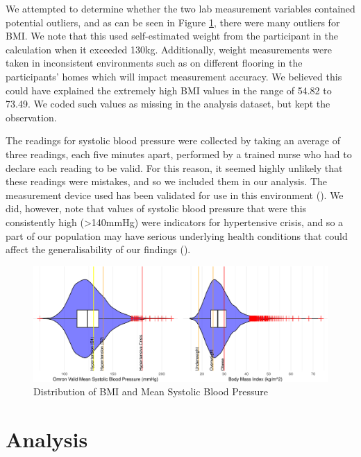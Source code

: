 \documentclass[
  11pt,
  twocolumn]{article}
\begin{document}
We attempted to determine whether the two lab measurement variables
contained potential outliers, and as can be seen in Figure
\ref{fig:output-distribution-plots}, there were many outliers for BMI.
We note that this used self-estimated weight from the participant in the
calculation when it exceeded 130kg. Additionally, weight measurements
were taken in inconsistent environments such as on different flooring in
the participants' homes which will impact measurement accuracy. We
believed this could have explained the extremely high BMI values in the
range of 54.82 to 73.49. We coded such values as missing in the analysis
dataset, but kept the observation.

The readings for systolic blood pressure were collected by taking an
average of three readings, each five minutes apart, performed by a
trained nurse who had to declare each reading to be valid. For this
reason, it seemed highly unlikely that these readings were mistakes, and
so we included them in our analysis. The measurement device used has
been validated for use in this environment (). We did, however, note that values of systolic blood
pressure that were this consistently high (\textgreater140mmHg) were
indicators for hypertensive crisis, and so a part of our population may
have serious underlying health conditions that could affect the
generalisability of our findings ().

\begin{figure}[H]
\includegraphics{Coursework_files/figure-latex/output-distribution-plots-1} \caption{Distribution of BMI and Mean Systolic Blood Pressure}\label{fig:output-distribution-plots}
\end{figure}

\section{Analysis}\label{analysis}
\end{document}
